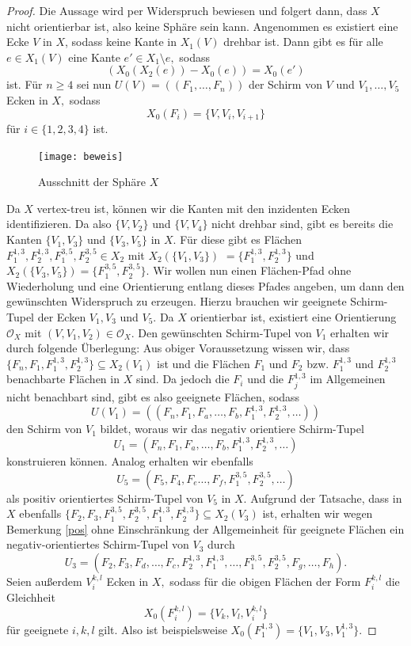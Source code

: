 \documentclass[12pt,titlepage,twoside,cleardoublepage]{article}
\theoremstyle{nummermitklammern}
\numberwithin{equation}{section}
\begin{document}
\begin{proof}
Die Aussage wird per Widerspruch bewiesen und folgert dann, dass $X$ nicht orientierbar ist, also keine Sphäre sein kann.
Angenommen es existiert eine Ecke $V$ in $X$, sodass keine Kante in $X_1(V)$ drehbar ist. Dann gibt es für alle $e\in X_1(V)$ eine Kante $e'\in X_1\setminus{e},$ sodass 
\[
(X_0(X_2(e))-X_0(e))=X_0(e')
\]
ist.
Für $n\geq 4$ sei nun $U(V)=((F_1,\ldots,F_n))$ der Schirm von $V$ und $V_1,\ldots,V_5$ Ecken in $X,$ sodass  
\[
X_0(F_i)=\{V,V_i,V_{i+1}\}
\] 
für $i\in\{1,2,3,4\}$ ist.
\begin{figure}[H]
\begin{center}
\texttt{[image: beweis]}
\end{center}
\caption{Ausschnitt der Sphäre $X$}
\end{figure} 
 Da $X$ vertex-treu ist, können wir die Kanten mit den inzidenten Ecken identifizieren. Da also $\{V,V_2\}$ und $\{V,V_4\}$ nicht drehbar sind, gibt es bereits die Kanten $\{V_1,V_3\}$ und $\{V_3,V_5\}$ in $X$. Für diese gibt es  Flächen $F^{1,3}_1,F^{1,3}_2,F^{3,5}_1,F^{3,5}_2\in X_2$ mit $X_2(\{V_1,V_3\})$ $=\{F^{1,3}_1,F^{1,3}_2\}$ und $X_2(\{V_3,V_5\})=\{F^{3,5}_1,F^{3,5}_2\}$. Wir wollen nun einen Flächen-Pfad ohne Wiederholung und eine Orientierung entlang dieses Pfades angeben, um dann den gewünschten Widerspruch zu erzeugen. Hierzu brauchen wir geeignete Schirm-Tupel der Ecken $V_1,V_3$ und $V_5.$ 
Da $X$ orientierbar ist, existiert eine Orientierung $\mathcal{O}_X$ mit $(V,V_1,V_2)\in \mathcal{O}_X.$
Den gewünschten Schirm-Tupel von $V_1$ erhalten wir durch folgende Überlegung: 
Aus obiger Voraussetzung wissen wir, dass $\{F_n,F_1,F_1^{1,3},F_2^{1,3}\}\subseteq X_2(V_1)$ ist und die Flächen $F_1$ und $F_2$ bzw. $F^{1,3}_1$ und $F^{1,3}_2$
benachbarte Flächen in $X$ sind. Da jedoch die $F_i$ und die $F_j^{1,3}$ im Allgemeinen nicht benachbart sind, gibt es also geeignete Flächen, sodass  
\[
U(V_1)=((F_n,F_1,F_a,\ldots,F_b,F^{1,3}_1,F^{1,3}_2,\ldots))
\]
den Schirm von $V_1$ bildet, woraus wir das negativ orientiere Schirm-Tupel
\[
U_1=(F_n,F_1,F_a,\ldots,F_b,F^{1,3}_1,F^{1,3}_2,\ldots)
\]  
konstruieren können.
Analog erhalten wir ebenfalls 
\[
U_5=(F_5,F_4,F_e\ldots,F_f,F^{3,5}_1,F^{3,5}_2,\ldots)
\] als positiv orientiertes Schirm-Tupel von $V_5$  in $X$. Aufgrund der Tatsache, dass in $X$ ebenfalls $\{F_2,F_3,F_1^{3,5},F_2^{3,5},F^{1,3}_1,F^{1,3}_2\}\subseteq X_2(V_3)$ ist,  erhalten wir wegen Bemerkung \ref{pos} ohne Einschränkung der Allgemeinheit für geeignete Flächen ein negativ-orientiertes Schirm-Tupel von $V_3$ durch
\[
U_3=(F_2,F_3,F_d,\ldots,F_c,F^{1,3}_2,F^{1,3}_1,\ldots,F_1^{3,5},F_2^{3,5},F_g,\ldots,F_h).
\]
Seien außerdem $V_i^{k,l}$ Ecken in $X,$ sodass für die obigen Flächen der Form $F_i^{k,l}$ die Gleichheit
\[
X_0(F^{k,l}_i)=\{V_k,V_l,V_i^{k,l}\}
\] für geeignete $i,k,l$ gilt. Also ist beispielsweise $X_0(F_1^{1,3})=\{V_1,V_3,V_1^{1,3}\}.$



\end{proof}
\end{document}
